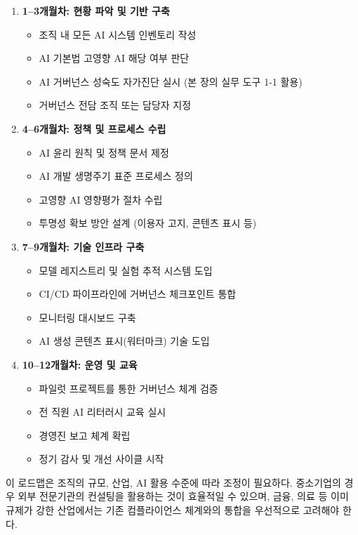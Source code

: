 \begin{enumerate}
    \item \textbf{1--3개월차: 현황 파악 및 기반 구축}
    \begin{itemize}
        \item 조직 내 모든 AI 시스템 인벤토리 작성
        \item AI 기본법 고영향 AI 해당 여부 판단
        \item AI 거버넌스 성숙도 자가진단 실시 (본 장의 실무 도구 1-1 활용)
        \item 거버넌스 전담 조직 또는 담당자 지정
    \end{itemize}
    \item \textbf{4--6개월차: 정책 및 프로세스 수립}
    \begin{itemize}
        \item AI 윤리 원칙 및 정책 문서 제정
        \item AI 개발 생명주기 표준 프로세스 정의
        \item 고영향 AI 영향평가 절차 수립
        \item 투명성 확보 방안 설계 (이용자 고지, 콘텐츠 표시 등)
    \end{itemize}
    \item \textbf{7--9개월차: 기술 인프라 구축}
    \begin{itemize}
        \item 모델 레지스트리 및 실험 추적 시스템 도입
        \item CI/CD 파이프라인에 거버넌스 체크포인트 통합
        \item 모니터링 대시보드 구축
        \item AI 생성 콘텐츠 표시(워터마크) 기술 도입
    \end{itemize}
    \item \textbf{10--12개월차: 운영 및 교육}
    \begin{itemize}
        \item 파일럿 프로젝트를 통한 거버넌스 체계 검증
        \item 전 직원 AI 리터러시 교육 실시
        \item 경영진 보고 체계 확립
        \item 정기 감사 및 개선 사이클 시작
    \end{itemize}
\end{enumerate}

이 로드맵은 조직의 규모, 산업, AI 활용 수준에 따라 조정이 필요하다. 중소기업의 경우 외부 전문기관의 컨설팅을 활용하는 것이 효율적일 수 있으며, 금융, 의료 등 이미 규제가 강한 산업에서는 기존 컴플라이언스 체계와의 통합을 우선적으로 고려해야 한다.

